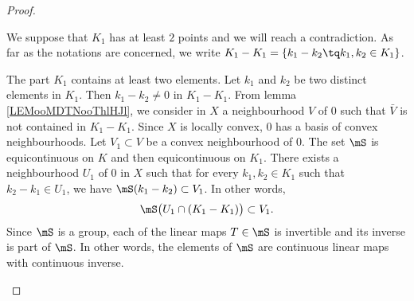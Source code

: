 \begin{proof}
\begin{subproof}
    \end{subproof}
    We suppose that \( K_1\) has at least \( 2\) points and we will reach a contradiction. As far as the notations are concerned, we write \( K_1-K_1=\{ k_1-k_2\tq k_1,k_2\in K_1 \}\).
    \begin{subproof}
        The part \( K_1\) contains at least two elements. Let \( k_1\) and \( k_2\) be two distinct elements in \( K_1\). Then \( k_1-k_2\neq 0\) in \( K_1-K_1\).
    \spitem[Definition of \( V\)]
        From lemma \ref{LEMooMDTNooThlHJl}, we consider in \( X\) a neighbourhood \( V\) of \( 0\) such that \( \bar V\) is not contained in \( K_1-K_1\).
    \spitem[Definition of \( V_1\)]
        Since \( X\) is locally convex, \( 0\) has a basis of convex neighbourhoods. Let \( V_1\subset V\) be a convex neighbourhood of \( 0\).
    \spitem[Definition of \( U_1\)]
        The set \( \mS\) is equicontinuous on \( K\) and then equicontinuous on \( K_1\). There exists a neighbourhood \( U_1\) of \( 0\) in \( X\) such that for every \( k_1,k_2\in K_1\) such that \( k_2-k_1\in U_1\), we have \( \mS(k_1-k_2)\subset  V_1\). In other words,
        \begin{equation}        \label{EQooPELQooJgcrzr}
            \mS\big( U_1\cap(K_1-K_1) \big)\subset V_1.
        \end{equation}
        Since \( \mS\) is a group, each of the linear maps \( T\in\mS\) is invertible and its inverse is part of \( \mS\). In other words, the elements of \( \mS\) are continuous linear maps with continuous inverse.


\end{subproof}
\end{proof}
